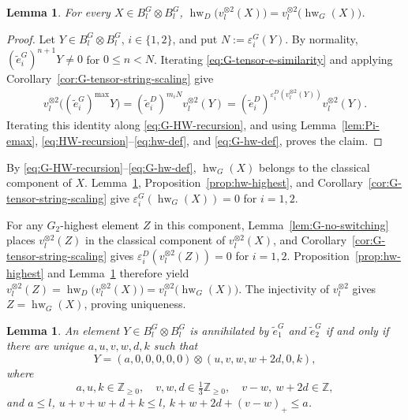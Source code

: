 \documentclass[11pt,reqno]{amsart}
\newcommand{\Zge}{\mathbb Z_{\ge 0}}
\newcommand{\hw}{\operatorname{hw}}
\numberwithin{table}{section}
\numberwithin{equation}{section}
\theoremstyle{plain}
\newtheorem{lemma}[theorem]{Lemma}
\theoremstyle{definition}
\begin{document}
\begin{lemma}
	\label{lem:G-highest-synchronization}
	For every \(X\in B_l^G\otimes B_l^G\), $\hw_D\bigl(v_l^{\otimes2}(X)\bigr)
	=
	v_l^{\otimes2}\bigl(\hw_G(X)\bigr)$.
\end{lemma}

\begin{proof}
	Let \(Y\in B_l^G\otimes B_l^G\), \(i\in\{1,2\}\), and
	put \(N:=\varepsilon_i^G(Y)\).
	By normality,
	\((\widetilde e_i^G)^{n+1}Y\ne0\) for \(0\le n<N\).
	Iterating \eqref{eq:G-tensor-e-similarity} and applying
	Corollary~\ref{cor:G-tensor-string-scaling} give
	\[
	\begin{aligned}
		v_l^{\otimes2}
		\bigl((\widetilde e_i^G)^{\max}Y\bigr)
		=
		(\widetilde e_i^D)^{m_iN}v_l^{\otimes2}(Y)
		=
		(\widetilde e_i^D)^{
			\varepsilon_i^D(v_l^{\otimes2}(Y))}
		v_l^{\otimes2}(Y).
	\end{aligned}
	\]
	Iterating this identity along \eqref{eq:G-HW-recursion},
	and using Lemma~\ref{lem:Pi-emax},
	\eqref{eq:HW-recursion}--\eqref{eq:hw-def}, and
	\eqref{eq:G-hw-def}, proves the claim.
\end{proof}

By \eqref{eq:G-HW-recursion}--\eqref{eq:G-hw-def},
\(\hw_G(X)\) belongs to the classical component of \(X\).
Lemma~\ref{lem:G-highest-synchronization},
Proposition~\ref{prop:hw-highest}, and
Corollary~\ref{cor:G-tensor-string-scaling} give
\(\varepsilon_i^G(\hw_G(X))=0\) for \(i=1,2\).

For any \(G_2\)-highest element \(Z\) in this component,
Lemma~\ref{lem:G-no-switching} places
\(v_l^{\otimes2}(Z)\) in the classical component of
\(v_l^{\otimes2}(X)\), and
Corollary~\ref{cor:G-tensor-string-scaling} gives
\(\varepsilon_i^D(v_l^{\otimes2}(Z))=0\) for \(i=1,2\).
Proposition~\ref{prop:hw-highest} and
Lemma~\ref{lem:G-highest-synchronization} therefore yield $v_l^{\otimes2}(Z)
=
\hw_D\bigl(v_l^{\otimes2}(X)\bigr)
=
v_l^{\otimes2}\bigl(\hw_G(X)\bigr)$.
The injectivity of \(v_l^{\otimes2}\) gives \(Z=\hw_G(X)\),
proving uniqueness.

\begin{lemma}
	\label{lem:G-highest-shape}
	An element \(Y\in B_l^G\otimes B_l^G\) is annihilated by
	\(\widetilde e_1^G\) and \(\widetilde e_2^G\) if and only if there
	are unique \(a,u,v,w,d,k\) such that
	\begin{equation}\label{eq:G-highest-shape}
		Y
		=
		(a,0,0,0,0,0)
		\otimes
		(u,v,w,w+2d,0,k),
	\end{equation}
	where
	\begin{equation}\label{eq:G-highest-lattice}
		a,u,k\in\Zge,
		\quad
		v,w,d\in\tfrac13\Zge,
		\quad
		v-w,\ w+2d\in\mathbb Z,
	\end{equation}
	and $a\le l$, $u+v+w+d+k\le l$, $k+w+2d+(v-w)_+\le a$.
\end{lemma}
\end{document}
